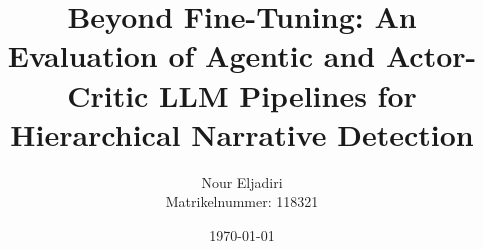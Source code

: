 \documentclass[
    numbers=noenddot,
    parskip=half-,
    fontsize=12pt,
    paper=a4,
    oneside,
    titlepage,
    bibliography=totoc,
    chapterprefix=false,
]{scrbook}
\title{Beyond Fine-Tuning: An Evaluation of Agentic and Actor-Critic LLM Pipelines for Hierarchical Narrative Detection}
\author{Nour Eljadiri\\Matrikelnummer: 118321}
\date{\today}
\begin{document}
\frontmatter
%


\tableofcontents
\newpage


\newpage


\newpage


\newpage


\newpage

\thispagestyle{empty}
\cleardoublepage
\listoffigures
\newpage

\thispagestyle{empty}
\cleardoublepage
\listoftables
\newpage

\mainmatter











\begin{appendices}
    
\end{appendices}
\newpage


\backmatter

\printbibliography


\end{document}

